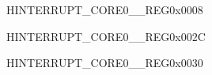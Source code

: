 





\begin{register}{H}{INTERRUPT\_CORE0\_\_REG}{0x0008}\label{regdesc:INTERRUPTCORE0PWRINTRMAPREG}






\end{register}\vspace{-3em}


































































\begin{register}{H}{INTERRUPT\_CORE0\_\_REG}{0x002C}\label{regdesc:INTERRUPTCORE0I2CMSTINTMAPREG}






\end{register}\vspace{-3em}


\begin{register}{H}{INTERRUPT\_CORE0\_\_REG}{0x0030}\label{regdesc:INTERRUPTCORE0SLC0INTRMAPREG}






\end{register}\vspace{-3em}


